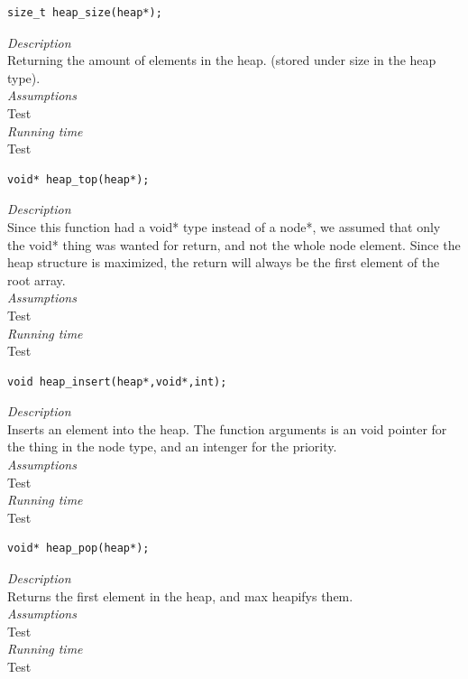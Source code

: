 \documentclass[11pt]{article}
\begin{document}
 \begin{lstlisting}[style=customc] 
size_t heap_size(heap*);\end{lstlisting} 

\textit{Description}\\
Returning the amount of elements in the heap. (stored under size in the heap type).\\
\textit{Assumptions}\\
Test\\
\textit{Running time}\\
Test





 \begin{lstlisting}[style=customc] 
void* heap_top(heap*);\end{lstlisting}

\textit{Description}\\
Since this function had a void* type instead of a node*, we assumed that only the void* thing was wanted for return, and not the whole node element. Since the heap structure is maximized, the return will always be the first element of the root array.\\
\textit{Assumptions}\\
Test\\
\textit{Running time}\\
Test

 


 \begin{lstlisting}[style=customc] 
void heap_insert(heap*,void*,int); \end{lstlisting} 

\textit{Description}\\
Inserts an element into the heap. The function arguments is an void pointer for the thing in the node type, and an intenger for the priority.\\ 
\textit{Assumptions}\\
Test\\
\textit{Running time}\\
Test


 \begin{lstlisting}[style=customc] 
void* heap_pop(heap*);\end{lstlisting}

\textit{Description}\\
Returns the first element in the heap, and max heapifys them.\\ 
\textit{Assumptions}\\
Test\\
\textit{Running time}\\
Test
\end{document}

